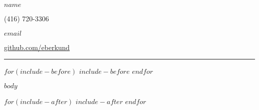 \documentclass{article}
\begin{document}
\noindent
\begin{minipage}[b]{0.6\textwidth}
\Huge\textbf{$name$}
\end{minipage}
\begin{minipage}[b]{0.4\textwidth}
\begin{flushright}%
(416) 720-3306\par
\href{mailto:$email$}{$email$}\par
\href{https://github.com/eberkund}{github.com/eberkund}\par
\end{flushright}
\end{minipage}
\smallskip
\hrule

$for(include-before)$
$include-before$
$endfor$

$body$

$for(include-after)$
$include-after$
$endfor$
\end{document}
